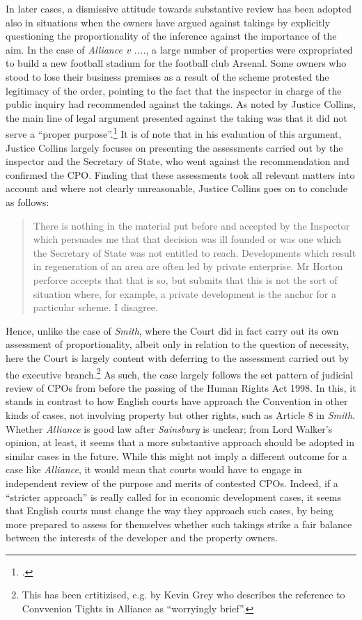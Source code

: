 In later cases, a dismissive attitude towards substantive review has been adopted also in situations when the owners have argued against takings by explicitly questioning the proportionality of the inference against the importance of the aim. In the case of {\it Alliance v ....}, a large number of properties were expropriated to build a new football stadium for the football club Arsenal. Some owners who stood to lose their business premises as a result of the scheme protested the legitimacy of the order, pointing to the fact that the inspector in charge of the public inquiry had recommended against the takings. As noted by Justice Collins, the main line of legal argument presented against the taking was that it did not serve a ``proper purpose''.\footcite[19]{alliance06} It is of note that in his evaluation of this argument, Justice Collins largely focuses on presenting the assessments carried out by the inspector and the Secretary of State, who went against the recommendation and confirmed the CPO. Finding that these assessments took all relevant matters into account and where not clearly unreasonable, Justice Collins goes on to conclude as follows: 

\begin{quote}
There is nothing in the material put before and accepted by the Inspector which persuades me that that decision was ill founded or was one which the Secretary of State was not entitled to reach. Developments which result in regeneration of an area are often led by private enterprise. Mr Horton perforce accepts that that is so, but submits that this is not the sort of situation where, for example, a private development is the anchor for a particular scheme. I disagree. 
\end{quote}

Hence, unlike the case of {\it Smith}, where the Court did in fact carry out its own assessment of proportionality, albeit only in relation to the question of necessity, here the Court is largely content with deferring to the assessment carried out by the executive branch.\footnote{This has been crtitizised, e.g. by Kevin Grey who describes the reference to Convvenion Tights in Alliance as ``worryingly brief''.} As such, the case largely follows the set pattern of judicial review of CPOs from before the passing of the Human Rights Act 1998. In this, it stands in contrast to how English courts have approach the Convention in other kinds of cases, not involving property but other rights, such as Article 8 in {\it Smith}. Whether {\it Alliance} is good law after {\it Sainsbury} is unclear; from Lord Walker's opinion, at least, it seems that a more substantive approach should be adopted in similar cases in the future. While this might not imply a different outcome for a case like {\it Alliance}, it would mean that courts would have to engage in independent review of the purpose and merits of contested CPOs. Indeed, if a ``stricter approach'' is really called for in economic development cases, it seems that English courts must change the way they approach such cases, by being more prepared to assess for themselves whether such takings strike a fair balance between the interests of the developer and the property owners.

